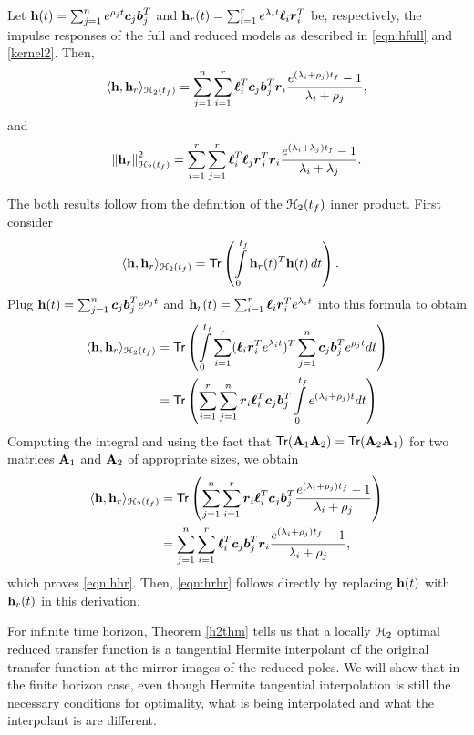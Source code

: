 \documentclass[twocolumn]{autart}
\begin{document}
\begin{Lemma}\label{minnerexp}

Let  $\mathbf{h} (t)= \sum_{j=1}^n e^{\rho_jt} \boldsymbol{c}_j \boldsymbol{b}_j^T $ and $\mathbf{h}_r(t) = \sum_{i=1}^r e^{\lambda_it}\boldsymbol{\ell}_i  \boldsymbol{r}_i^T $ be, respectively, the impulse responses of the full and reduced models  as described in \eqref{eqn:hfull} and \eqref{kernel2}.
Then,
\begin{align} \label{eqn:hhr}
\langle\mathbf{h}, \mathbf{h}_r\rangle_{\EuScript{H}_2({t_f})}=\sum_{j=1}^n\sum_{i=1}^r\boldsymbol{\ell}_{i}^T\boldsymbol{c}_j\boldsymbol{b}_j^T\boldsymbol{r}_{i}\dfrac{e^{(\lambda_i+\rho_j){t_f}}-1}{\lambda_i+\rho_j},
\end{align}
and
\begin{align} \label{eqn:hrhr}
\left\lVert\mathbf{h}_r\right\rVert_{\EuScript{H}_2({t_f})}^2= \sum_{i=1}^r\sum_{j=1}^r\boldsymbol{\ell}_{i}^T\boldsymbol{\ell}_{j}\boldsymbol{r}_{j}^T\boldsymbol{r}_{i}\dfrac{e^{(\lambda_i+\lambda_j){t_f}}-1}{\lambda_i+\lambda_j}.
\end{align}
\end{Lemma}
\begin{pf}
The both results  follow from the definition of the $\EuScript{H}_2(t_f)$ inner product.  First consider
\begin{align*}
\langle\h, \h_r\rangle_{\ch_2({\tf})}&=\mathsf{Tr}\left(\int_0^{\tf}\h_r(t)^T\h(t)\, dt\right).
\end{align*}
Plug $\mathbf{h} (t)= \sum_{j=1}^n \boldsymbol{c}_j \boldsymbol{b}_j^T e^{\rho_jt}$ and $\mathbf{h}_r(t) = \sum_{i=1}^r \boldsymbol{\ell}_i  \boldsymbol{r}_i^T e^{\lambda_it}$
into this formula to obtain
\begin{align*}
\langle\h, \h_r\rangle_{\ch_2({\tf})}&=\mathsf{Tr} \left(\int_0^{\tf}\sum_{i=1}^r(\lc_{i}\rc_{i}^Te^{\lambda_it})^T\sum_{j=1}^n\cc_j\bb_j^Te^{\rho_jt}dt\right)\\
 &= \mathsf{Tr} \left(\sum_{i=1}^r 
\sum_{j=1}^n 
\rc_{i}\lc_{i}^T\cc_j \bb_j^T \int_0^{\tf}e^{(\lambda_i + \rho_j )t} dt\right)
\end{align*}
Computing the integral and using the fact that $\mathsf{Tr}(\mathbf{A}_1 \mathbf{A}_2) = \mathsf{Tr}(\mathbf{A}_2 \mathbf{A}_1)$  for two matrices $\mathbf{A}_1$ and $\mathbf{A}_2$ of  appropriate sizes,   we obtain
\begin{align*}
\langle\mathbf{h}, \mathbf{h}_r\rangle_{\EuScript{H}_2({t_f})}&=\mathsf{Tr}\left(\sum_{j=1}^n\sum_{i=1}^r\boldsymbol{r}_{i}\boldsymbol{\ell}_{i}^T\boldsymbol{c}_j\boldsymbol{b}_j^T\dfrac{e^{(\lambda_i+\rho_j){t_f}}-1}{\lambda_i+\rho_j}\right)\\
&=\sum_{j=1}^n\sum_{i=1}^r\boldsymbol{\ell}_{i}^T\boldsymbol{c}_j\boldsymbol{b}_j^T\boldsymbol{r}_{i}\dfrac{e^{(\lambda_i+\rho_j){t_f}}-1}{\lambda_i+\rho_j},
\end{align*}
which proves \eqref{eqn:hhr}. Then, \eqref{eqn:hrhr} follows directly by replacing $\mathbf{h}(t)$ with $\mathbf{h}_r(t)$ in this derivation. 
\end{pf}
For infinite time horizon, Theorem \ref{h2thm} tells us that a locally $\EuScript{H}_2$ optimal reduced transfer function is a tangential Hermite interpolant of the original transfer function at the mirror images of the reduced poles. We will show that in the finite horizon case, even though Hermite tangential interpolation is still the necessary conditions for optimality,  what is being interpolated and what the interpolant is are different.
\end{document}
